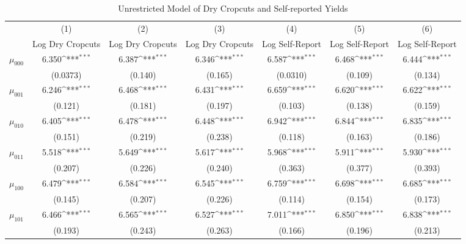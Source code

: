 \begin{table}[htbp]\centering
\def\sym#1{\ifmmode^{#1}\else\(^{#1}\)\fi}
\caption{Unrestricted Model of Dry Cropcuts and Self-reported Yields \label{tbl:unres}}
\begin{tabular}{l*{6}{c}}
\hline\hline
          &\multicolumn{1}{c}{(1)}&\multicolumn{1}{c}{(2)}&\multicolumn{1}{c}{(3)}&\multicolumn{1}{c}{(4)}&\multicolumn{1}{c}{(5)}&\multicolumn{1}{c}{(6)}\\
          &\multicolumn{1}{c}{Log Dry Cropcuts}&\multicolumn{1}{c}{Log Dry Cropcuts}&\multicolumn{1}{c}{Log Dry Cropcuts}&\multicolumn{1}{c}{Log Self-Report}&\multicolumn{1}{c}{Log Self-Report}&\multicolumn{1}{c}{Log Self-Report}\\
\hline
$\mu_{000}$&    6.350\sym{***}&    6.387\sym{***}&    6.346\sym{***}&    6.587\sym{***}&    6.468\sym{***}&    6.444\sym{***}\\
          & (0.0373)         &  (0.140)         &  (0.165)         & (0.0310)         &  (0.109)         &  (0.134)         \\
$\mu_{001}$&    6.246\sym{***}&    6.468\sym{***}&    6.431\sym{***}&    6.659\sym{***}&    6.620\sym{***}&    6.622\sym{***}\\
          &  (0.121)         &  (0.181)         &  (0.197)         &  (0.103)         &  (0.138)         &  (0.159)         \\
$\mu_{010}$&    6.405\sym{***}&    6.478\sym{***}&    6.448\sym{***}&    6.942\sym{***}&    6.844\sym{***}&    6.835\sym{***}\\
          &  (0.151)         &  (0.219)         &  (0.238)         &  (0.118)         &  (0.163)         &  (0.186)         \\
$\mu_{011}$&    5.518\sym{***}&    5.649\sym{***}&    5.617\sym{***}&    5.968\sym{***}&    5.911\sym{***}&    5.930\sym{***}\\
          &  (0.207)         &  (0.226)         &  (0.240)         &  (0.363)         &  (0.377)         &  (0.393)         \\
$\mu_{100}$&    6.479\sym{***}&    6.584\sym{***}&    6.545\sym{***}&    6.759\sym{***}&    6.698\sym{***}&    6.685\sym{***}\\
          &  (0.145)         &  (0.207)         &  (0.226)         &  (0.114)         &  (0.154)         &  (0.173)         \\
$\mu_{101}$&    6.466\sym{***}&    6.565\sym{***}&    6.527\sym{***}&    7.011\sym{***}&    6.850\sym{***}&    6.838\sym{***}\\
          &  (0.193)         &  (0.243)         &  (0.263)         &  (0.166)         &  (0.196)         &  (0.213)         \\

\end{tabular}
\end{table}
